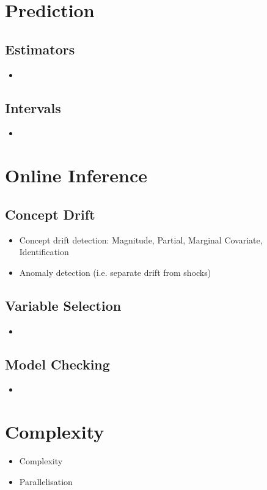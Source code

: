 \section{Prediction}
\subsection{Estimators}
\begin{itemize}
\item 
\end{itemize}

\subsection{Intervals}
\begin{itemize}
\item
\end{itemize}

\section{Online Inference}
\subsection{Concept Drift}
\begin{itemize}
\item Concept drift detection: Magnitude, Partial, Marginal Covariate, Identification 
\item Anomaly detection (i.e. separate drift from shocks)
\end{itemize}

\subsection{Variable Selection}
\begin{itemize}
\item 
\end{itemize}

\subsection{Model Checking}
\begin{itemize}
\item
\end{itemize}

\section{Complexity}
\begin{itemize}
\item Complexity
\item Parallelisation
\end{itemize}
